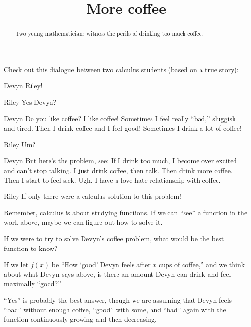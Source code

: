 \documentclass{ximera}
\title[Break-Ground:]{More coffee}
\begin{document}
\begin{abstract}
Two young mathematicians witness the perils of drinking too much
coffee.
\end{abstract}
\maketitle

Check out this dialogue between two calculus students (based on a true
story):

\begin{dialogue}
\item[Devyn] Riley! 
\item[Riley] Yes Devyn?
\item[Devyn] Do you like coffee? I like coffee! Sometimes I feel
  really ``bad,'' sluggish and tired. Then I drink coffee and I feel
  good! Sometimes I drink a lot of coffee!
\item[Riley] Um?
\item[Devyn] But here's the problem, see: If I drink too much, I
  become over excited and can't stop talking. I just drink coffee,
  then talk. Then drink more coffee. Then I start to feel sick. Ugh. I
  have a love-hate relationship with coffee.
\item[Riley] If only there were a calculus solution to this problem!
\end{dialogue}

Remember, calculus is about studying functions. If we can ``see'' a function in the work above, maybe we can figure out how to solve it. 

\begin{problem}
  If we were to try to solve Devyn's coffee problem, what would be the best
  function to know?
  \begin{multipleChoice}
  \end{multipleChoice}
\begin{problem}
  If we let $f(x)$ be ``How `good' Devyn feels after $x$ cups of
  coffee,'' and we think about what Devyn says above, is there an amount Devyn can drink and feel maximally ``good?''
  \begin{multipleChoice}
  \end{multipleChoice}
  \begin{feedback}
    ``Yes'' is probably the best answer, though we are assuming that
    Devyn feels ``bad'' without enough coffee, ``good'' with some, and
    ``bad'' again with the function continuously growing and then
    decreasing.
  \end{feedback}
\end{problem}
\end{problem}




%
\end{document}
